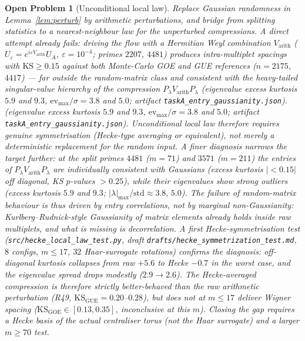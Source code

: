 \documentclass[11pt]{article}
\newtheorem{openproblem}[theorem]{Open Problem}
\begin{document}
\begin{openproblem}[Unconditional local law]\label{op:local}
Replace Gaussian randomness in Lemma~\ref{lem:perturb} by arithmetic
perturbations, and bridge from splitting statistics to a
nearest-neighbour law for the unperturbed compressions.
A direct attempt already \emph{fails}: driving the flow with a
Hermitian Weyl combination $V_{\mathrm{arith}}$
($U_\varepsilon=e^{i\varepsilon V_{\mathrm{arith}}}U_A$,
$\varepsilon=10^{-4}$; primes $2207$, $4481$) produces
intra-multiplet spacings with $\mathrm{KS}\ge0.15$ against
\emph{both} Monte-Carlo GOE and GUE references
($n=2175$, $4417$) --- far outside the random-matrix class and
consistent with the heavy-tailed singular-value hierarchy of the
compression $P_\lambda V_{\mathrm{arith}}P_\lambda$
(eigenvalue excess kurtosis $5.9$ and $9.3$, $\mathrm{ev}_{\max}/\sigma = 3.8$ and $5.0$; artifact
\texttt{taskA\_entry\_gaussianity.json}).
(eigenvalue excess kurtosis $5.9$ and $9.3$, $\mathrm{ev}_{\max}/\sigma = 3.8$ and $5.0$; artifact
\texttt{taskA\_entry\_gaussianity.json}).
Unconditional local law therefore requires genuine symmetrisation
(Hecke-type averaging or equivalent), not merely a deterministic
replacement for the random input.
A finer diagnosis narrows the target further: at the split primes
$4481$ ($m=71$) and $3571$ ($m=211$) the \emph{entries} of
$P_\lambda V_{\mathrm{arith}}P_\lambda$ are individually consistent
with Gaussians (excess kurtosis $|{<}0.15|$ off diagonal,
KS $p$-values ${>}0.25$), while their eigenvalues show strong
outliers (excess kurtosis $5.9$ and $9.3$;
$|\lambda|_{\max}/\mathrm{std}\approx3.8,\,5.0$). The failure of
random-matrix behaviour is thus driven by entry \emph{correlations},
not by marginal non-Gaussianity: Kurlberg--Rudnick-style Gaussianity
of matrix elements already holds inside raw multiplets, and what is
missing is decorrelation.  A first Hecke-symmetrisation test
(\texttt{src/hecke\_local\_law\_test.py}, draft
\texttt{drafts/hecke\_symmetrization\_test.md},
$8$ configs, $m \le 17$, $32$ Haar-surrogate rotations) confirms the
diagnosis: off-diagonal kurtosis collapses from
raw $+5.6$ to Hecke $-0.7$ in the worst case, and the eigenvalue
spread drops modestly ($2.9 \to 2.6$). The Hecke-averaged compression
is therefore \emph{strictly better-behaved} than the raw arithmetic
perturbation (R49, $\mathrm{KS}_{\mathrm{GUE}} = 0.20$–$0.28$), but
does not at $m \le 17$ deliver Wigner spacing
($\mathrm{KS}_{\mathrm{GOE}} \in [0.13, 0.35]$, inconclusive at
this $m$). Closing the gap requires a Hecke basis of the actual
centraliser torus (not the Haar surrogate) and a larger
$m \ge 70$ test.
\end{openproblem}
\end{document}
